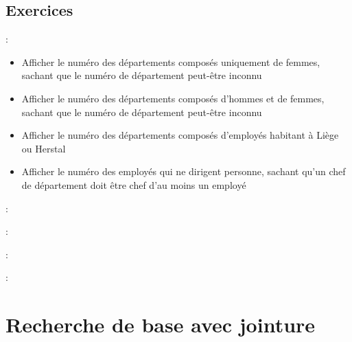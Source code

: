\documentclass[10pt]{beamer}
\begin{document}
\subsection{Exercices}
\begin{frame}{\secname : \subsecname}
    \begin{itemize}
        \item Afficher le numéro des départements composés uniquement de femmes, sachant que le numéro de département peut-être inconnu
        \item Afficher le numéro des départements composés d'hommes et de femmes, sachant que le numéro de département peut-être inconnu
        \item Afficher le numéro des départements composés d'employés habitant à Liège ou Herstal
        \item Afficher le numéro des employés qui ne dirigent personne, sachant qu'un chef de département doit être chef d'au moins un employé
    \end{itemize}
\end{frame}

\begin{frame}{\secname : \subsecname}
    
\end{frame}

\begin{frame}{\secname : \subsecname}
    
\end{frame}

\begin{frame}{\secname : \subsecname}
    
\end{frame}
\begin{frame}{\secname : \subsecname}
    
\end{frame}

\section{Recherche de base avec jointure}
\tocss
\end{document}
